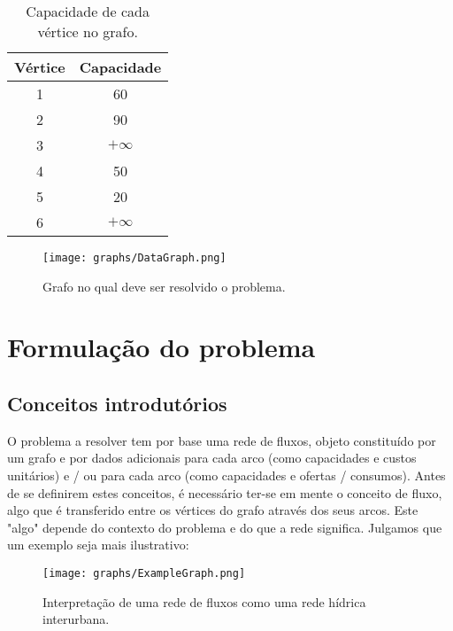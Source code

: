 \documentclass[12pt, a4paper, titlepage]{article}
\begin{document}
\begin{table}[H]
    \begin{center}
        \begin{tabular}{c|c}
            Vértice & Capacidade \\
            \hline
            1 & 60        \\
            2 & 90        \\
            3 & $+\infty$ \\
            4 & 50        \\
            5 & 20        \\
            6 & $+\infty$
        \end{tabular}
    \end{center}
    \caption{Capacidade de cada vértice no grafo.}
    \label{vertices-capacities}
\end{table}

\begin{figure}[H]
    \centering
    \texttt{[image: graphs/DataGraph.png]}
    \caption{Grafo no qual deve ser resolvido o problema.}
    \label{data-graph}
\end{figure}

\pagebreak
\section{Formulação do problema}

\subsection{Conceitos introdutórios}

O problema a resolver tem por base uma rede de fluxos, objeto constituído por um grafo e por dados
adicionais para cada arco (como capacidades e custos unitários) e / ou para cada arco (como
capacidades e ofertas / consumos). Antes de se definirem estes conceitos, é necessário ter-se em
mente o conceito de fluxo, algo que é transferido entre os vértices do grafo através dos seus arcos.
Este "algo"{} depende do contexto do problema e do que a rede significa. Julgamos que um exemplo
seja mais ilustrativo:

\begin{figure}[H]
    \centering
    \texttt{[image: graphs/ExampleGraph.png]}
    \caption{Interpretação de uma rede de fluxos como uma rede hídrica interurbana.}
    \label{example-graph}
\end{figure}
\end{document}
